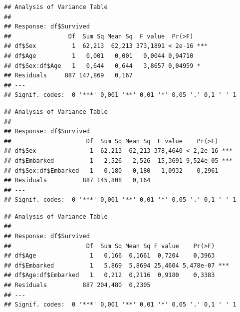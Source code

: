 \documentclass[]{article}
\newenvironment{Shaded}{\begin{snugshade}}{\end{snugshade}}
\newcommand{\KeywordTok}[1]{\textcolor[rgb]{0.13,0.29,0.53}{\textbf{#1}}}
\newcommand{\StringTok}[1]{\textcolor[rgb]{0.31,0.60,0.02}{#1}}
\newcommand{\OperatorTok}[1]{\textcolor[rgb]{0.81,0.36,0.00}{\textbf{#1}}}
\newcommand{\NormalTok}[1]{#1}
\begin{document}
\begin{verbatim}
## Analysis of Variance Table
## 
## Response: df$Survived
##                Df  Sum Sq Mean Sq  F value  Pr(>F)    
## df$Sex          1  62,213  62,213 373,1891 < 2e-16 ***
## df$Age          1   0,001   0,001   0,0044 0,94710    
## df$Sex:df$Age   1   0,644   0,644   3,8657 0,04959 *  
## Residuals     887 147,869   0,167                     
## ---
## Signif. codes:  0 '***' 0,001 '**' 0,01 '*' 0,05 '.' 0,1 ' ' 1
\end{verbatim}

\begin{Shaded}
\end{Shaded}

\begin{verbatim}
## Analysis of Variance Table
## 
## Response: df$Survived
##                     Df  Sum Sq Mean Sq  F value    Pr(>F)    
## df$Sex               1  62,213  62,213 378,4640 < 2,2e-16 ***
## df$Embarked          1   2,526   2,526  15,3691 9,524e-05 ***
## df$Sex:df$Embarked   1   0,180   0,180   1,0932    0,2961    
## Residuals          887 145,808   0,164                       
## ---
## Signif. codes:  0 '***' 0,001 '**' 0,01 '*' 0,05 '.' 0,1 ' ' 1
\end{verbatim}

\begin{Shaded}
\end{Shaded}

\begin{verbatim}
## Analysis of Variance Table
## 
## Response: df$Survived
##                     Df  Sum Sq Mean Sq F value    Pr(>F)    
## df$Age               1   0,166  0,1661  0,7204    0,3963    
## df$Embarked          1   5,869  5,8694 25,4604 5,478e-07 ***
## df$Age:df$Embarked   1   0,212  0,2116  0,9180    0,3383    
## Residuals          887 204,480  0,2305                      
## ---
## Signif. codes:  0 '***' 0,001 '**' 0,01 '*' 0,05 '.' 0,1 ' ' 1
\end{verbatim}
\end{document}
